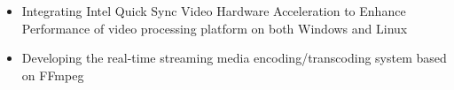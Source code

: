 \documentclass[10pt,a4paper]{article} %
\begin{document}
\begin{minipage}[t]{0.44\textwidth}
\normalsize{\begin{itemize}
              \item Integrating Intel Quick Sync Video Hardware Acceleration to Enhance Performance of video processing platform on both Windows and Linux
              \item Developing the real-time streaming media encoding/transcoding system based on FFmpeg
            \end{itemize}
}
%
%
%
%
%
%
%

%






\end{minipage}
\end{document}
